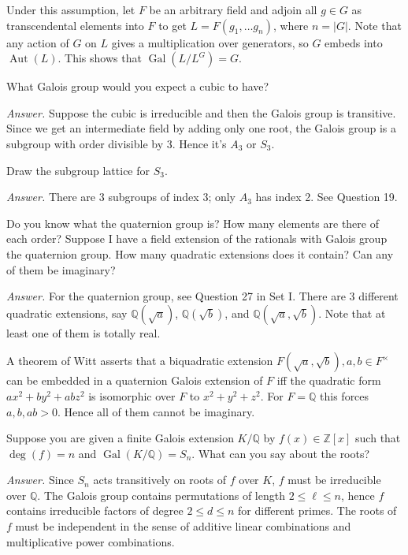 \documentclass{mathproblems}
\newcommand\Q{\mathbb{Q}}
\newcommand\Z{\mathbb{Z}}
\DeclareMathOperator{\Aut}{Aut}
\DeclareMathOperator{\Gal}{Gal}
\begin{document}
\begin{questions}
Under this assumption, let $F$ be an arbitrary field and adjoin all $g\in G$ as transcendental elements into $F$ to get $L=F(g_1,\ldots g_n)$, where $n=|G|$. Note that any action of $G$ on $L$ gives a multiplication over generators, so $G$ embeds into $\Aut(L)$. This shows that $\Gal(L/L^G)=G$.

\miquestion
{\color{blue} What Galois group would you expect a cubic to have?}

\textit{Answer.}
Suppose the cubic is irreducible and then the Galois group is transitive. Since we get an intermediate field by adding only one root, the Galois group is a subgroup with order divisible by 3. Hence it's $A_3$ or $S_3$.

\miquestion
{\color{blue} Draw the subgroup lattice for $S_{3}$.}

\textit{Answer.} There are 3 subgroups of index 3; only $A_3$ has index 2. See Question 19.

\miquestion
{\color{blue} Do you know what the quaternion group is? How many elements are there of each order? Suppose I have a field extension of the rationals with Galois group the quaternion group. How many quadratic extensions does it contain? Can any of them be imaginary?}

\textit{Answer.} For the quaternion group, see Question 27 in Set I. There are 3 different quadratic extensions, say $\Q(\sqrt{a})$, $\Q(\sqrt{b})$, and $\Q(\sqrt{a},\sqrt{b})$. Note that at least one of them is totally real.

A theorem of Witt asserts that a biquadratic extension $F(\sqrt{a}, \sqrt{b}), a, b \in F^{\times}$ can be embedded in a quaternion Galois extension of $F$ iff the quadratic form $a x^{2}+b y^{2}+a b z^{2}$ is isomorphic over $F$ to $x^{2}+y^{2}+z^{2}$. For $F=\mathbb{Q}$ this forces $a, b, a b>0$. Hence all of them cannot be imaginary.

\miquestion
{\color{blue} Suppose you are given a finite Galois extension $K / \Q$ by $f(x) \in \Z[x]$ such that $\operatorname{deg}(f)=n$ and $\Gal(K / \Q)=S_{n}$. What can you say about the roots?}

\textit{Answer.} Since $S_n$ acts transitively on roots of $f$ over $K$, $f$ must be irreducible over $\Q$. The Galois group contains permutations of length $2\leqslant \ell\leqslant n$, hence $f$ contains irreducible factors of degree $2\leqslant d\leqslant n$ for different primes. The roots of $f$ must be independent in the sense of additive linear combinations and multiplicative power combinations.


\end{questions}
\end{document}

